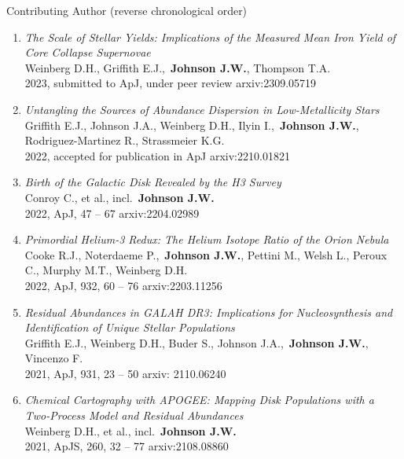 \documentclass[cv.tex]{subfiles}
\begin{document}
\vspace{5mm}
\par\noindent
{\color{themecolor} \large Contributing Author}
(reverse chronological order)
\par\noindent
\begin{enumerate}

	\vspace{-3mm}

	\item \textit{The Scale of Stellar Yields: Implications of the Measured
	Mean Iron Yield of Core Collapse Supernovae}
	\\
	Weinberg D.H., Griffith E.J.,~\textbf{Johnson J.W.}, Thompson T.A.
	\\
	2023, submitted to ApJ, under peer review \hfill arxiv:2309.05719

	\item \textit{Untangling the Sources of Abundance Dispersion in
	Low-Metallicity Stars}
	\\
	Griffith E.J., Johnson J.A., Weinberg D.H., Ilyin I.,~\textbf{Johnson J.W.},
	Rodriguez-Martinez R., Strassmeier K.G.
	\\
	2022, accepted for publication in ApJ \hfill arxiv:2210.01821

	\item \textit{Birth of the Galactic Disk Revealed by the H3 Survey}
	\\
	Conroy C., et al., incl.~\textbf{Johnson J.W.}
	\\
	2022, ApJ, 47 -- 67 \hfill arxiv:2204.02989

	\item \textit{Primordial Helium-3 Redux: The Helium Isotope Ratio of the
	Orion Nebula}
	\\
	Cooke R.J., Noterdaeme P.,~\textbf{Johnson J.W.}, Pettini M., Welsh L.,
	Peroux C., Murphy M.T., Weinberg D.H.
	\\
	2022, ApJ, 932, 60 -- 76 \hfill arxiv:2203.11256

	\item \textit{Residual Abundances in GALAH DR3: Implications for
	Nucleosynthesis and Identification of Unique Stellar Populations}
	\\
	Griffith E.J., Weinberg D.H., Buder S., Johnson J.A.,~\textbf{Johnson J.W.},
	Vincenzo F.
	\\
	2021, ApJ, 931, 23 -- 50 \hfill arxiv: 2110.06240

	\item \textit{Chemical Cartography with APOGEE: Mapping Disk Populations
	with a Two-Process Model and Residual Abundances}
	\\
	Weinberg D.H., et al., incl.~\textbf{Johnson J.W.}
	\\
	2021, ApJS, 260, 32 -- 77 \hfill arxiv:2108.08860


\end{enumerate}
\end{document}

